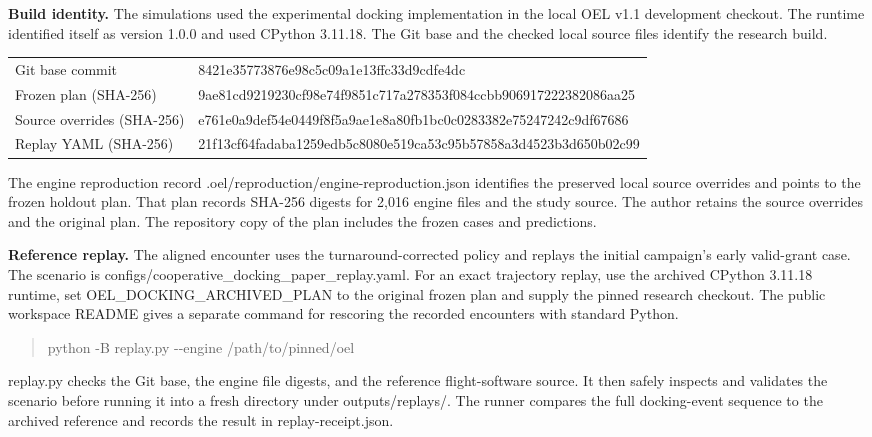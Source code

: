 \documentclass[10pt,letterpaper]{article}
\begin{document}
\textbf{Build identity.} The simulations used the experimental docking implementation in the local OEL v1.1 development checkout. The runtime identified itself as version 1.0.0 and used CPython 3.11.18. The Git base and the checked local source files identify the research build.

\begin{tabular}{@{}p{1.7in}l@{}}
Git base commit &
  \textsf{8421e35773876e98c5c09a1e13ffc33d9cdfe4dc} \\
Frozen plan (SHA-256) &
  \textsf{9ae81cd9219230cf98e74f9851c717a278353f084ccbb906917222382086aa25} \\
Source overrides (SHA-256) &
  \textsf{e761e0a9def54e0449f8f5a9ae1e8a80fb1bc0c0283382e75247242c9df67686} \\
Replay YAML (SHA-256) &
  \textsf{21f13cf64fadaba1259edb5c8080e519ca53c95b57858a3d4523b3d650b02c99}
\end{tabular}

The engine reproduction record \textsf{.oel/reproduction/engine-reproduction.json} identifies the preserved local source overrides and points to the frozen holdout plan. That plan records SHA-256 digests for 2,016 engine files and the study source. The author retains the source overrides and the original plan. The repository copy of the plan includes the frozen cases and predictions.

\textbf{Reference replay.} The aligned encounter uses the turnaround-corrected policy and replays the initial campaign's early valid-grant case. The scenario is \textsf{configs/cooperative\_docking\_paper\_replay.yaml}. For an exact trajectory replay, use the archived CPython 3.11.18 runtime, set \textsf{OEL\_DOCKING\_ARCHIVED\_PLAN} to the original frozen plan and supply the pinned research checkout. The public workspace README gives a separate command for rescoring the recorded encounters with standard Python.

\begin{quote}
\sffamily python -B replay.py -\kern0pt-engine /path/to/pinned/oel
\end{quote}

\textsf{replay.py} checks the Git base, the engine file digests, and the reference flight-software source. It then safely inspects and validates the scenario before running it into a fresh directory under \textsf{outputs/replays/}. The runner compares the full docking-event sequence to the archived reference and records the result in \textsf{replay-receipt.json}.
\end{document}
